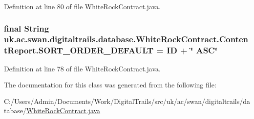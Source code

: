 Definition at line 80 of file White\+Rock\+Contract.\+java.

\hypertarget{classuk_1_1ac_1_1swan_1_1digitaltrails_1_1database_1_1_white_rock_contract_1_1_content_report_a183c701ed689aacf52f517120604896a}{
\subsubsection[{S\+O\+R\+T\+\_\+\+O\+R\+D\+E\+R\+\_\+\+D\+E\+F\+A\+U\+L\+T}]{\setlength{\rightskip}{0pt plus 5cm}final String uk.\+ac.\+swan.\+digitaltrails.\+database.\+White\+Rock\+Contract.\+Content\+Report.\+S\+O\+R\+T\+\_\+\+O\+R\+D\+E\+R\+\_\+\+D\+E\+F\+A\+U\+L\+T = I\+D + \char`\"{} A\+S\+C\char`\"{}\hspace{0.3cm}{\ttfamily [static]}}}\label{classuk_1_1ac_1_1swan_1_1digitaltrails_1_1database_1_1_white_rock_contract_1_1_content_report_a183c701ed689aacf52f517120604896a}


Definition at line 78 of file White\+Rock\+Contract.\+java.



The documentation for this class was generated from the following file\+:\begin{DoxyCompactItemize}
\item 
C\+:/\+Users/\+Admin/\+Documents/\+Work/\+Digital\+Trails/src/uk/ac/swan/digitaltrails/database/\hyperlink{_white_rock_contract_8java}{White\+Rock\+Contract.\+java}\end{DoxyCompactItemize}
